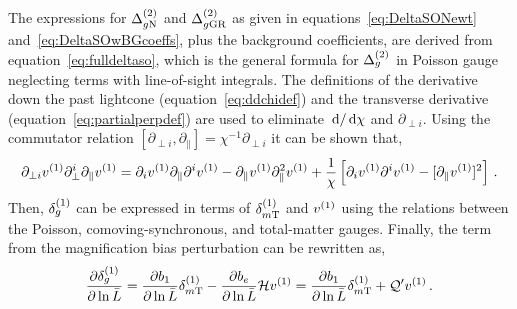 The expressions for $\Delta^{(2)}_{g\mathrm{N}}$ and $\Delta^{(2)}_{g\mathrm{GR}}$ as given in equations~\eqref{eq:DeltaSONewt} and~\eqref{eq:DeltaSOwBGcoeffs}, plus the background coefficients, are derived from equation~\eqref{eq:fulldeltaso}, which is the general formula for $\Delta_g^{(2)}$ in Poisson gauge neglecting terms with line-of-sight integrals. The definitions of the derivative down the past lightcone (equation~\eqref{eq:ddchidef}) and the transverse derivative (equation~\eqref{eq:partialperpdef}) are used to eliminate $\,\mathrm{d}/\,\mathrm{d}\chi$ and $\partial_{\perp i}$. 
Using the commutator relation $\left[ \partial_{\perp i}, \partial_\parallel \right] = \chi^{-1} \partial_{\perp i}$ it can be shown that, 
\begin{equation}
	\partial_{\perp i}v^{(1)} \partial_\perp^i \partial_\parallel v^{(1)} = \partial_i v^{(1)} \partial_\parallel \partial^i v^{(1)} - \partial_\parallel v^{(1)} \partial_\parallel^2 v^{(1)} + \frac{1}{\chi} \left[ \partial_i v^{(1)} \partial^i v^{(1)} - [\partial_\parallel v^{(1)}]^2 \right]\,.
\end{equation}
Then, $\delta_g^{(1)}$ can be expressed in terms of $\delta_{m\mathrm{T}}^{(1)}$ and $v^{(1)}$ using the relations between the Poisson, comoving-synchronous, and total-matter gauges. 
Finally, the term from the magnification bias perturbation can be rewritten as, 
\begin{equation}
	\frac{\partial \delta_g^{(1)}}{\partial\ln \bar{L}} = \frac{\partial b_1}{\partial\ln\bar{L}} \delta_{m\mathrm{T}}^{(1)} - \frac{\partial b_e}{\partial\ln\bar{L}} \mathcal{H} v^{(1)} = \frac{\partial b_1}{\partial\ln\bar{L}} \delta_{m\mathrm{T}}^{(1)} + \mathcal{Q}' v^{(1)} \,.
\end{equation}

